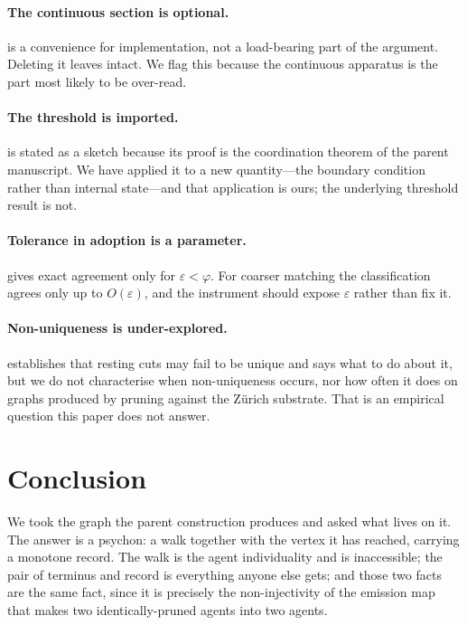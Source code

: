 \documentclass[11pt,a4paper]{article}
\theoremstyle{clstyle}
\theoremstyle{definition}
\theoremstyle{remark}
\begin{document}
\paragraph{The continuous section is optional.}
 is a convenience for implementation, not a load-bearing
part of the argument. Deleting it leaves
intact. We flag this because the continuous apparatus is the part most
likely to be over-read.

\paragraph{The threshold is imported.}
 is stated as a sketch because its proof is the
coordination theorem of the parent manuscript. We have applied it to a new
quantity---the boundary condition rather than internal state---and that
application is ours; the underlying threshold result is not.

\paragraph{Tolerance in adoption is a parameter.}
 gives exact agreement only for $\varepsilon<\varphi$.
For coarser matching the classification agrees only up to $O(\varepsilon)$,
and the instrument should expose $\varepsilon$ rather than fix it.

\paragraph{Non-uniqueness is under-explored.}
 establishes that resting cuts may fail to be unique
and  says what to do about it, but we do not
characterise when non-uniqueness occurs, nor how often it does on graphs
produced by pruning against the Z\"urich substrate. That is an empirical
question this paper does not answer.

\section{Conclusion}

We took the graph the parent construction produces and asked what lives on
it. The answer is a psychon: a walk together with the vertex it has reached,
carrying a monotone record. The walk is the agent individuality and is
inaccessible; the pair of terminus and record is everything anyone else
gets; and those two facts are the same fact, since it is precisely the
non-injectivity of the emission map that makes two identically-pruned agents
into two agents.
\end{document}
